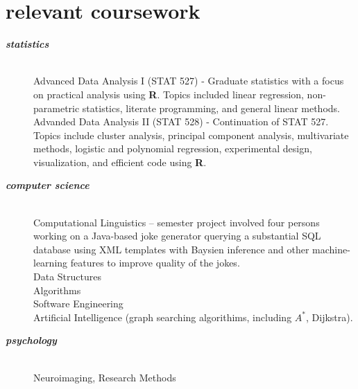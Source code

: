 \documentclass[]{friggeri-cv} %
\begin{document}
\section{relevant coursework}
\begin{description}
   \item[\textbf{\textit{statistics}}] \hfill \\
	 Advanced Data Analysis I (STAT 527) - Graduate statistics with a focus on practical analysis using \textbf{R}. 
	 Topics included linear regression, non-parametric statistics, literate programming, and general linear methods. \hfill  \\
	 Advanded Data Analysis II (STAT 528) - Continuation of STAT 527. 
	 Topics include cluster analysis, principal component analysis, multivariate methods, 
	 logistic and polynomial regression, experimental design, visualization, and efficient code using \textbf{R}.
   \item[\textbf{\textit{computer science}}] \hfill \\
	   Computational Linguistics – semester project involved four persons 
	   working on a Java-based joke generator querying a substantial SQL database using 
	   XML templates with Baysien inference and other machine-learning features to improve quality 
	   of the jokes. \hfill \\
	   Data Structures\hfill \\
	   Algorithms \hfill \\
	   Software Engineering \hfill \\
	   Artificial Intelligence (graph searching algorithims, including $A^*$, Dijkstra). 
   \item[\textbf{\textit{psychology}}] \hfill \\  
	 Neuroimaging, Research Methods 
\end{description}

\end{document}
